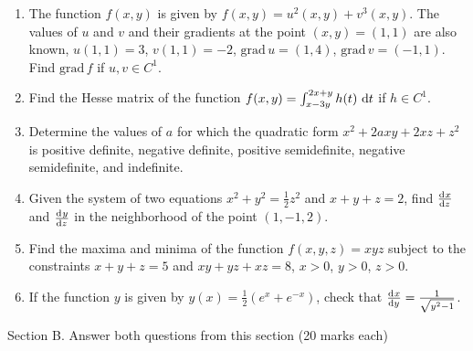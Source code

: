 \documentclass[pdftex,12pt,a4paper]{article}
\providecommand{\grad}{\mathrm{grad}\,}
\begin{document}
\begin{enumerate}

\item The function $f(x,y)$ is given by $f(x,y)=u^2(x,y)+v^3(x,y)$. The values of $u$ and $v$ and their gradients at the point $(x,y)=(1,1)$ are also known, $u(1,1)=3$, $v(1,1)=-2$, $\grad u=(1,4)$, $\grad v=(-1,1)$. Find $\grad f$ if $u,v \in C^1$.
\item Find the Hesse matrix of the function $f(x,y)=\int_{x-3y}^{2x+y}h(t)\,\dif t$ if $h\in C^1$.

\item Determine the values of $a$ for which the quadratic form $x^2 + 2axy + 2xz + z^2$ is positive definite, negative definite, positive semidefinite, negative semidefinite, and indefinite.

\item Given the system of two equations $x^2+y^2=\frac{1}{2}z^2$ and $x+y+z=2$, find $\od{x}{z}$ and $\od{y}{z}$ in the neighborhood of the point $(1,-1,2)$.

\item Find the maxima and minima of the function $f(x,y,z)=xyz$ subject to the constraints $x+y+z=5$ and $xy+yz+xz=8$, $x>0$, $y>0$, $z>0$.

\item If the function $y$ is given by $y(x)=\frac{1}{2}(e^x+e^{-x})$, check that $\od{x}{y}=\frac{1}{\sqrt{y^2-1}} $.
\end{enumerate}

Section B. Answer both questions from this section (20 marks each) \\
\end{document}
